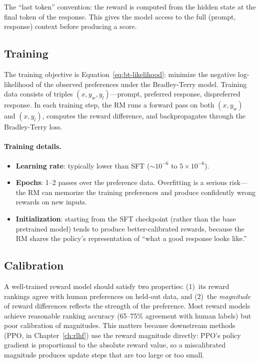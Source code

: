 The ``last token'' convention: the reward is computed from the hidden state at the final token of the response. This gives the model access to the full (prompt, response) context before producing a score.

\subsection{Training}

The training objective is Equation~\ref{eq:bt-likelihood}: minimize the negative log-likelihood of the observed preferences under the Bradley-Terry model. Training data consists of triples $(x, y_w, y_l)$---prompt, preferred response, dispreferred response. In each training step, the RM runs a forward pass on both $(x, y_w)$ and $(x, y_l)$, computes the reward difference, and backpropagates through the Bradley-Terry loss.

\paragraph{Training details.}
\begin{itemize}[nosep]
  \item \textbf{Learning rate}: typically lower than SFT ($\sim$$10^{-6}$ to $5 \times 10^{-6}$).
  \item \textbf{Epochs}: 1--2 passes over the preference data. Overfitting is a serious risk---the RM can memorize the training preferences and produce confidently wrong rewards on new inputs.
  \item \textbf{Initialization}: starting from the SFT checkpoint (rather than the base pretrained model) tends to produce better-calibrated rewards, because the RM shares the policy's representation of ``what a good response looks like.''
\end{itemize}

\subsection{Calibration}

A well-trained reward model should satisfy two properties: (1)~its reward rankings agree with human preferences on held-out data, and (2)~the \emph{magnitude} of reward differences reflects the strength of the preference. Most reward models achieve reasonable ranking accuracy (65--75\% agreement with human labels) but poor calibration of magnitudes. This matters because downstream methods (PPO, in Chapter~\ref{ch:rlhf}) use the reward magnitude directly: PPO's policy gradient is proportional to the absolute reward value, so a miscalibrated magnitude produces update steps that are too large or too small.

